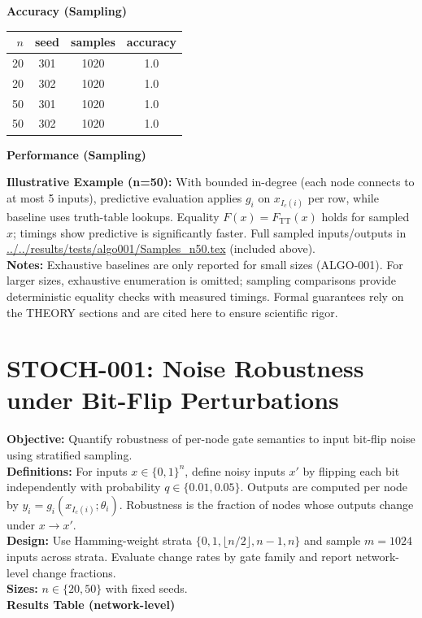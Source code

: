 \documentclass{article}
\begin{document}
\textbf{Accuracy (Sampling)}\\
\begin{center}
\begin{tabular}{rccc}
\toprule
$n$ & seed & samples & accuracy \\
\midrule
20 & 301 & 1020 & 1.0 \\
20 & 302 & 1020 & 1.0 \\
50 & 301 & 1020 & 1.0 \\
50 & 302 & 1020 & 1.0 \\
\bottomrule
\end{tabular}
\end{center}
\textbf{Performance (Sampling)}
 
\textbf{Illustrative Example (n=50):} With bounded in-degree (each node connects to at most 5 inputs), predictive evaluation applies \(g_i\) on \(x_{I_c(i)}\) per row, while baseline uses truth-table lookups. Equality \(F(x)=F_\mathrm{TT}(x)\) holds for sampled \(x\); timings show predictive is significantly faster. Full sampled inputs/outputs in \url{../../results/tests/algo001/Samples_n50.tex} (included above).\\
\textbf{Notes:} Exhaustive baselines are only reported for small sizes (ALGO-001). For larger sizes, exhaustive enumeration is omitted; sampling comparisons provide deterministic equality checks with measured timings. Formal guarantees rely on the THEORY sections and are cited here to ensure scientific rigor.

\section{STOCH-001: Noise Robustness under Bit-Flip Perturbations}
\textbf{Objective:} Quantify robustness of per-node gate semantics to input bit-flip noise using stratified sampling.\\
\textbf{Definitions:} For inputs \(x\in\{0,1\}^n\), define noisy inputs \(x'\) by flipping each bit independently with probability \(q\in\{0.01,0.05\}\). Outputs are computed per node by \(y_i=g_i(x_{I_c(i)};\theta_i)\). Robustness is the fraction of nodes whose outputs change under \(x\to x'\).\\
\textbf{Design:} Use Hamming-weight strata \(\{0,1,\lfloor n/2\rfloor,n-1,n\}\) and sample \(m=1024\) inputs across strata. Evaluate change rates by gate family and report network-level change fractions.\\
\textbf{Sizes:} \(n\in\{20,50\}\) with fixed seeds.\\
\textbf{Results Table (network-level)}
 
\end{document}
